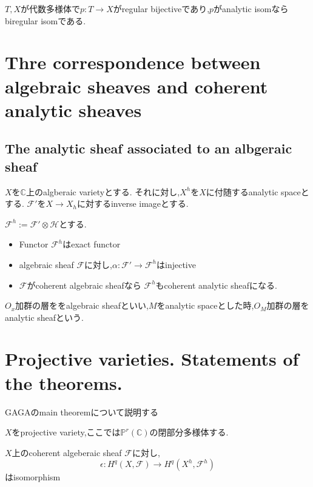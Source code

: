 \begin{prop}
 $T,X$が代数多様体で$p: T \to X$がregular bijectiveであり,$p$がanalytic isomならbiregular isomである.
\end{prop}

\section{Thre correspondence between algebraic sheaves and coherent analytic sheaves}

\subsection{The analytic sheaf associated to an albgeraic sheaf}
$X$を$\mathbb{C}$上のalgberaic varietyとする.
それに対し,$X^h$を$X$に付随するanalytic spaceとする.
$\mathcal{F}'$を$X \to X_h$に対するinverse imageとする.

$\mathcal{F}^h:= \mathcal{F}' \otimes \mathcal{H}$とする.

\begin{prop}
 \begin{itemize}
     \item Functor $\mathcal{F}^h$はexact functor
     \item algebraic sheaf $\mathcal{F}$に対し,$\alpha: \mathcal{F}' \to \mathcal{F}^h$はinjective
     \item $\mathcal{F}$がcoherent algebraic sheafなら $\mathcal{F}^h$もcoherent analytic sheafになる.
 \end{itemize}
\end{prop}



$O_x$加群の層ををalgebraic sheafといい,$M$をanalytic spaceとした時,$O_{M}$加群の層をanalytic sheafという.


\section{Projective varieties. Statements of the theorems.}
GAGAのmain theoremについて説明する

$X$をprojective variety,ここでは$\mathbb{P}^r(\mathbb{C})$の閉部分多様体する.

\begin{thm}
$X$上のcoherent algeberaic sheaf $\mathcal{F}$に対し,
\begin{equation*}
 \epsilon: H^q(X, \mathcal{F}) \to H^q(X^h, \mathcal{F}^h)
\end{equation*}
はisomorphism
\end{thm}

